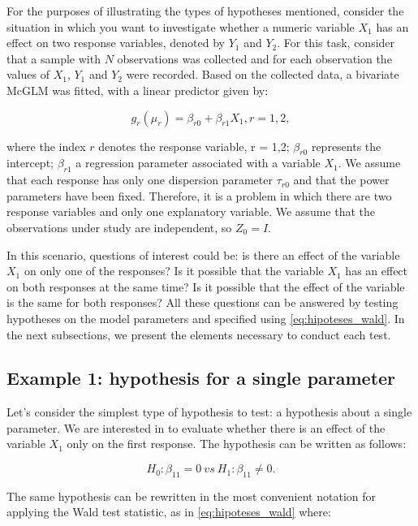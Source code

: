 \documentclass[AMA,STIX1COL]{WileyNJD-v2}
\begin{document}
For the purposes of illustrating the types of hypotheses mentioned, consider the situation in which you want to investigate whether a numeric variable $X_1$ has an effect on two response variables, denoted by $Y_1$ and $Y_2$. For this task, consider that a sample with $N$ observations was collected and for each observation the values of $X_1$, $Y_1$ and $Y_2$ were recorded. Based on the collected data, a bivariate McGLM was fitted, with a linear predictor given by:

\begin{equation}
\label{eq:pred_ex}
g_r(\mu_r) = \beta_{r0} + \beta_{r1} X_1, r=1,2,
\end{equation}

\noindent where the index $r$ denotes the response variable, r = 1,2; $\beta_{r0}$ represents the intercept; $\beta_{r1}$ a regression parameter associated with a variable $X_1$. We assume that each response has only one dispersion parameter $\tau_{r0}$ and that the power parameters have been fixed. Therefore, it is a problem in which there are two response variables and only one explanatory variable. We assume that the observations under study are independent, so $Z_0 = I$. 

In this scenario, questions of interest could be: is there an effect of the variable $X_1$ on only one of the responses? Is it possible that the variable $X_1$ has an effect on both responses at the same time? Is it possible that the effect of the variable is the same for both responses? All these questions can be answered by testing hypotheses on the model parameters and specified using \autoref{eq:hipoteses_wald}. In the next subsections, we present the elements necessary to conduct each test.

\subsection{Example 1: hypothesis for a single parameter}

Let's consider the simplest type of hypothesis to test: a hypothesis about a single parameter. We are interested in to evaluate whether there is an effect of the variable $X_1$ only on the first response. The hypothesis can be written as follows:

\begin{equation}
\label{eq:ex1}
H_0: \beta_{11} = 0 \ vs \ H_1: \beta_{11} \neq 0.
\end{equation}

The same hypothesis can be rewritten in the most convenient notation for applying the Wald test statistic, as in \autoref{eq:hipoteses_wald} where:
\end{document}
